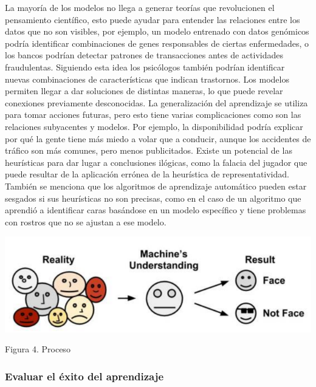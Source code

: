 \documentclass[
  letterpaper,
  DIV=11,
  numbers=noendperiod]{scrartcl}
\begin{document}
La mayoría de los modelos no llega a generar teorías que revolucionen el
pensamiento científico, esto puede ayudar para entender las relaciones
entre los datos que no son visibles, por ejemplo, un modelo entrenado
con datos genómicos podría identificar combinaciones de genes
responsables de ciertas enfermedades, o los bancos podrían detectar
patrones de transacciones antes de actividades fraudulentas. Siguiendo
esta idea los psicólogos también podrían identificar nuevas
combinaciones de características que indican trastornos. Los modelos
permiten llegar a dar soluciones de distintas maneras, lo que puede
revelar conexiones previamente desconocidas. La generalización del
aprendizaje se utiliza para tomar acciones futuras, pero esto tiene
varias complicaciones como son las relaciones subyacentes y modelos. Por
ejemplo, la disponibilidad podría explicar por qué la gente tiene más
miedo a volar que a conducir, aunque los accidentes de tráfico son más
comunes, pero menos publicitados. Existe un potencial de las heurísticas
para dar lugar a conclusiones ilógicas, como la falacia del jugador que
puede resultar de la aplicación errónea de la heurística de
representatividad. También se menciona que los algoritmos de aprendizaje
automático pueden estar sesgados si sus heurísticas no son precisas,
como en el caso de un algoritmo que aprendió a identificar caras
basándose en un modelo específico y tiene problemas con rostros que no
se ajustan a ese modelo.

\begin{Figura 4. Proceso}

{\centering \includegraphics{cap4.png}

}

\caption{Figura 4. Proceso}

\end{Figura 4. Proceso}

\hypertarget{evaluar-el-uxe9xito-del-aprendizaje}{%
\subsubsection{Evaluar el éxito del
aprendizaje}\label{evaluar-el-uxe9xito-del-aprendizaje}}
\end{document}
